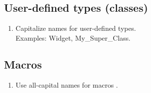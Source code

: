 \documentclass[a4paper,11pt]{scrbook}
\begin{document}
	\subsection{User-defined types (classes)}
	
		\begin{enumerate}
			\item Capitalize names for user-defined types.\\
				Examples: Widget, My\_Super\_Class.
		\end{enumerate}
	
	
	\subsection{Macros}
	
		\begin{enumerate}
			\item Use all-capital names for macros \cite{Stroustrup_2013__Cpp_Prog_Lang}.
		\end{enumerate}



\printbibliography[heading=bibintoc]
\end{document}
